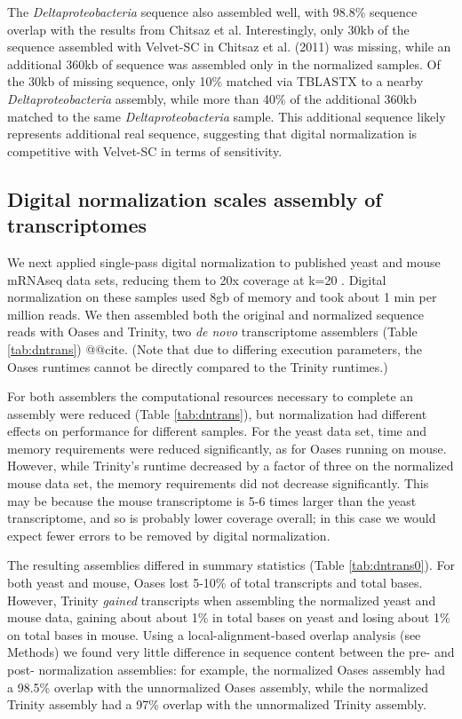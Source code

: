 \documentclass[10pt]{article}
\begin{document}
The {\em Deltaproteobacteria} sequence also assembled well, with
98.8\% sequence overlap with the results from Chitsaz et al.
Interestingly, only 30kb of the sequence assembled with Velvet-SC in
Chitsaz et al. (2011) was missing, while an additional 360kb of
sequence was assembled only in the normalized samples.  Of the 30kb of
missing sequence, only 10\% matched via TBLASTX to a nearby {\em
  Deltaproteobacteria} assembly, while more than 40\% of the
additional 360kb matched to the same {\em Deltaproteobacteria} sample.
This additional sequence likely represents additional real
sequence, suggesting that digital normalization is competitive with
Velvet-SC in terms of sensitivity.



\subsection*{Digital normalization scales assembly of transcriptomes}

We next applied single-pass digital normalization to published yeast
and mouse mRNAseq data sets, reducing them to 20x coverage at k=20
\cite{pubmed21572440}.  Digital normalization on these samples used
8gb of memory and took about 1 min per million reads.  We then
assembled both the original and normalized sequence reads with Oases
and Trinity, two {\em de novo} transcriptome assemblers (Table
\ref{tab:dntrans}) @@cite.  (Note that due to differing execution
parameters, the Oases runtimes cannot be directly compared to the
Trinity runtimes.)

For both assemblers the computational resources necessary to complete
an assembly were reduced (Table \ref{tab:dntrans}), but normalization
had different effects on performance for different samples.  For the
yeast data set, time and memory requirements were reduced
significantly, as for Oases running on mouse.  However, while
Trinity's runtime decreased by a factor of three on the normalized
mouse data set, the memory requirements did not decrease
significantly.  This may be because the mouse transcriptome is 5-6
times larger than the yeast transcriptome, and so is probably lower
coverage overall; in this case we would expect fewer errors to be removed
by digital normalization.

The resulting assemblies differed in summary statistics (Table
\ref{tab:dntrans0}).  For both yeast and mouse, Oases lost 5-10\% of
total transcripts and total bases.  However, Trinity {\em gained}
transcripts when assembling the normalized yeast and mouse data,
gaining about about 1\% in total bases on yeast and losing about 1\%
on total bases in mouse.  Using a local-alignment-based overlap
analysis (see Methods) we found very little difference in sequence
content between the pre- and post- normalization assemblies: for
example, the normalized Oases assembly had a 98.5\% overlap with the
unnormalized Oases assembly, while the normalized Trinity assembly had
a 97\% overlap with the unnormalized Trinity assembly.
\end{document}
